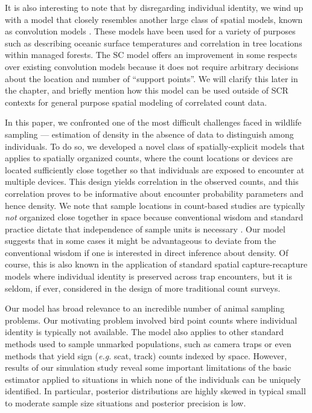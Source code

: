 It is also interesting to note that by disregarding individual
identity, we wind up with a model that closely resembles another large
class of spatial models, known as convolution models
\citep{wolpert_ickstadt:1998,higdon:1998}. These
models have been used for a variety of purposes such as describing oceanic
surface temperatures and correlation in tree locations within managed
forests. The SC model offers an improvement in
some respects over existing convolution models because it does not
require arbitrary decisions about the location and number of ``support
points''. We will clarify this later in the chapter, and briefly
mention how this model can be used outside of SCR contexts for general
purpose spatial modeling of correlated count data.


In this paper, we confronted one of the most difficult challenges
faced in wildlife sampling ---
estimation of density in the absence of data to distinguish among
individuals. To do so, we developed a novel class of
spatially-explicit models that
applies to spatially organized counts, where the count locations or
devices are located sufficiently close together so that individuals
are exposed to encounter at multiple devices. This design yields
correlation in the observed counts, and this correlation proves to be
informative about encounter probability parameters and hence density.
We note that sample locations in count-based studies are typically
{\it not} organized close
together in space because conventional wisdom and standard practice
dictate that independence of sample units is necessary
\citep{hurlbert:1984}. Our model
suggests that in some cases it might be advantageous to deviate from
the conventional wisdom if one is interested in direct inference about
density. Of course, this is also known in the application of standard spatial
capture-recapture  models \citep{borchers_efford:2008}
where individual
identity is preserved across trap encounters, but it is seldom, if
ever, considered in the design of more traditional count surveys.

Our model has broad relevance to an incredible number of animal
sampling problems. Our motivating problem involved bird point counts
where individual
identity is typically not available. The model also applies
to other standard methods used to sample unmarked
populations,  such as camera traps
or even methods that yield sign ({\it e.g.} scat, track) counts
indexed by space. However, results of our simulation study reveal some
important limitations of the basic
estimator applied to situations in which none of the individuals can
be uniquely identified. In particular, posterior
distributions are highly skewed in typical small to moderate sample
size situations and posterior precision is low.

